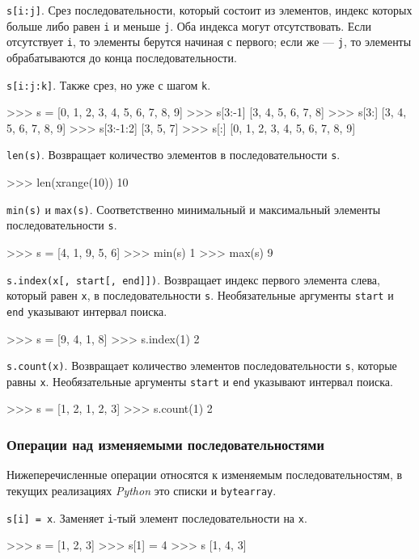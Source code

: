 \lstinline{s[i:j]}. Срез последовательности, который состоит из элементов, индекс которых больше либо равен \lstinline{i} и меньше \lstinline{j}. Оба индекса могут отсутствовать. Если отсутствует \lstinline{i}, то элементы берутся начиная с первого; если же — \lstinline{j}, то элементы обрабатываются до конца последовательности.

\lstinline{s[i:j:k]}. Также срез, но уже с шагом \lstinline{k}.
\begin{pylst}{}{}
>>> s = [0, 1, 2, 3, 4, 5, 6, 7, 8, 9]
>>> s[3:-1]
[3, 4, 5, 6, 7, 8]
>>> s[3:]
[3, 4, 5, 6, 7, 8, 9]
>>> s[3:-1:2]
[3, 5, 7]
>>> s[:]
[0, 1, 2, 3, 4, 5, 6, 7, 8, 9]
\end{pylst}

\lstinline{len(s)}. Возвращает количество элементов в последовательности \lstinline{s}.
\begin{pylst}{}{}
>>> len(xrange(10))
10
\end{pylst}

\lstinline{min(s)} и \lstinline{max(s)}. Соответственно минимальный и максимальный элементы последовательности \lstinline{s}.
\begin{pylst}{}{}
>>> s = [4, 1, 9, 5, 6]
>>> min(s)
1
>>> max(s)
9
\end{pylst}

\lstinline{s.index(x[, start[, end]])}. Возвращает индекс первого элемента слева, который равен \lstinline{x}, в последовательности \lstinline{s}. Необязательные аргументы \lstinline{start} и \lstinline{end} указывают интервал поиска.
\begin{pylst}{}{}
>>> s = [9, 4, 1, 8]
>>> s.index(1)
2
\end{pylst}

\lstinline{s.count(x)}. Возвращает количество элементов последовательности \lstinline{s}, которые равны \lstinline{x}. Необязательные аргументы \lstinline{start} и \lstinline{end} указывают интервал поиска.
\begin{pylst}{}{}
>>> s = [1, 2, 1, 2, 3]
>>> s.count(1)
2
\end{pylst}

\subsubsection{Операции над изменяемыми последовательностями}
Нижеперечисленные операции относятся к изменяемым последовательностям, в текущих реализациях \emph{Python} это списки и \lstinline{bytearray}.

\lstinline{s[i] = x}. Заменяет \lstinline{i}-тый элемент последовательности на \lstinline{x}.
\begin{pylst}{}{}
>>> s = [1, 2, 3]
>>> s[1] = 4
>>> s
[1, 4, 3]
\end{pylst}

